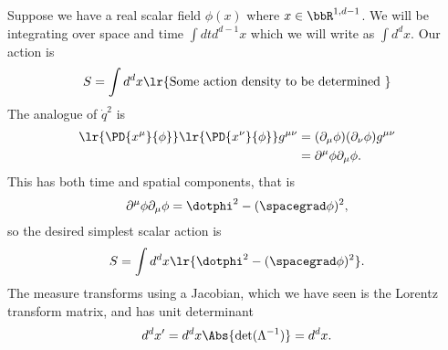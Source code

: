 Suppose we have a real scalar field \( \phi(x) \) where \( x \in \bbR^{1,d-1} \).  We will be integrating over space and time \( \int dt d^{d-1} x \) which we will write as \( \int d^d x \).  Our action is
\begin{equation}\label{eqn:qftLecture3:400}
S = \int d^d x \lr{ \text{Some action density to be determined } }
\end{equation}
The analogue of \( \dot{q}^2 \) is
\begin{equation}\label{eqn:qftLecture3:420}
\begin{aligned}
\lr{ \PD{x^\mu}{\phi} }
\lr{ \PD{x^\nu}{\phi} }
g^{\mu\nu}
&=
(\partial_\mu \phi) (\partial_\nu \phi) g^{\mu\nu} \\
&= \partial^\mu \phi \partial_\mu \phi.
\end{aligned}
\end{equation}
This has both time and spatial components, that is
\begin{equation}\label{eqn:qftLecture3:440}
\partial^\mu \phi \partial_\mu \phi =
\dotphi^2 - (\spacegrad \phi)^2,
\end{equation}
so the desired simplest scalar action is
\begin{equation}\label{eqn:qftLecture3:460}
S = \int d^d x \lr{ \dotphi^2 - (\spacegrad \phi)^2 }.
\end{equation}
The measure transforms using a Jacobian, which we have seen is the Lorentz transform matrix, and has unit determinant
\begin{equation}\label{eqn:qftLecture3:480}
d^d x' = d^d x \Abs{ \det( \Lambda^{-1} ) } = d^d x.
\end{equation}
